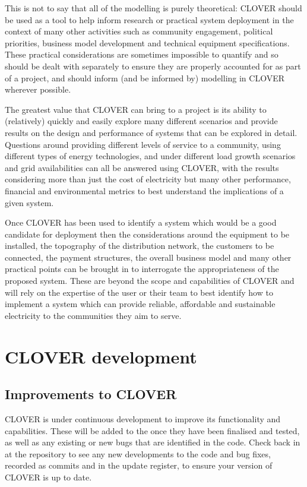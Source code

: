 \documentclass[letterpaper,10pt,english]{sphinxmanual}
\begin{document}
\sphinxAtStartPar
This is not to say that all of the modelling is purely theoretical:
CLOVER should be used as a tool to help inform research or practical
system deployment in the context of many other activities such as
community engagement, political priorities, business model development
and technical equipment specifications. These practical considerations
are sometimes impossible to quantify and so should be dealt with
separately to ensure they are properly accounted for as part of a
project, and should inform (and be informed by) modelling in CLOVER
wherever possible.

\sphinxAtStartPar
The greatest value that CLOVER can bring to a project is its ability to
(relatively) quickly and easily explore many different scenarios and
provide results on the design and performance of systems that can be
explored in detail. Questions around providing different levels of
service to a community, using different types of energy technologies,
and under different load growth scenarios and grid availabilities can
all be answered using CLOVER, with the results considering more than
just the cost of electricity but many other performance, financial and
environmental metrics to best understand the implications of a given
system.

\sphinxAtStartPar
Once CLOVER has been used to identify a system which would be a good
candidate for deployment then the considerations around the equipment to
be installed, the topography of the distribution network, the customers
to be connected, the payment structures, the overall business model and
many other practical points can be brought in to interrogate the
appropriateness of the proposed system. These are beyond the scope and
capabilities of CLOVER and will rely on the expertise of the user or
their team to best identify how to implement a system which can provide
reliable, affordable and sustainable electricity to the communities they
aim to serve.


\section{CLOVER development}
\label{\detokenize{get_involved:clover-development}}\label{\detokenize{get_involved::doc}}

\subsection{Improvements to CLOVER}
\label{\detokenize{get_involved:improvements-to-clover}}
\sphinxAtStartPar
CLOVER is under continuous development to improve its functionality and
capabilities. These will be added to the  once they have been
finalised and tested, as well as any existing or new bugs that are
identified in the code. Check back in at the repository to see any new
developments to the code and bug fixes, recorded as commits and in the
update register, to ensure your version of CLOVER is up to date.
\end{document}
